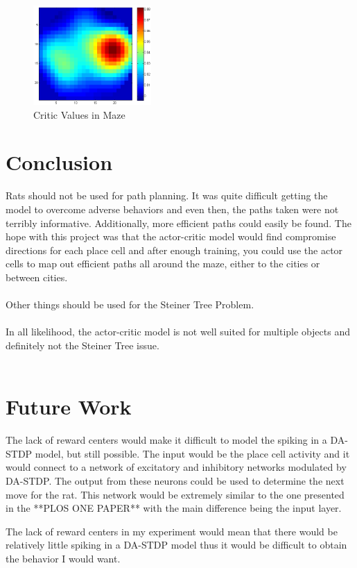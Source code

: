 \documentclass[conference]{IEEEtran}
\begin{document}
\begin{figure}
\includegraphics[width=0.4\textwidth]{waterMazeRevisedD_Critic_populationRewards.png} 
\caption{Critic Values in Maze}
\end{figure}

\section{Conclusion}
Rats should not be used for path planning. It was quite difficult getting the model to overcome adverse behaviors and even then, the paths taken were not terribly informative. Additionally, more efficient paths could easily be found. The hope with this project was that the actor-critic model would find compromise directions for each place cell and after enough training, you could use the actor cells to map out efficient paths all around the maze, either to the cities or between cities. \\
\\
Other things should be used for the Steiner Tree Problem. \\
\\
In all likelihood, the actor-critic model is not well suited for multiple objects and definitely not the Steiner Tree issue. \\
\\

\section{Future Work}

The lack of reward centers would make it difficult to model the spiking in a DA-STDP model, but still possible. The input would be the place cell activity and it would connect to a network of excitatory and inhibitory networks modulated by DA-STDP. The output from these neurons could be used to determine the next move for the rat. This network would be extremely similar to the one presented in the **PLOS ONE PAPER** with the main difference being the input layer. 

The lack of reward centers in my experiment would mean that there would be relatively little spiking in a DA-STDP model thus it would be difficult to obtain the behavior I would want. 





\end{document}
